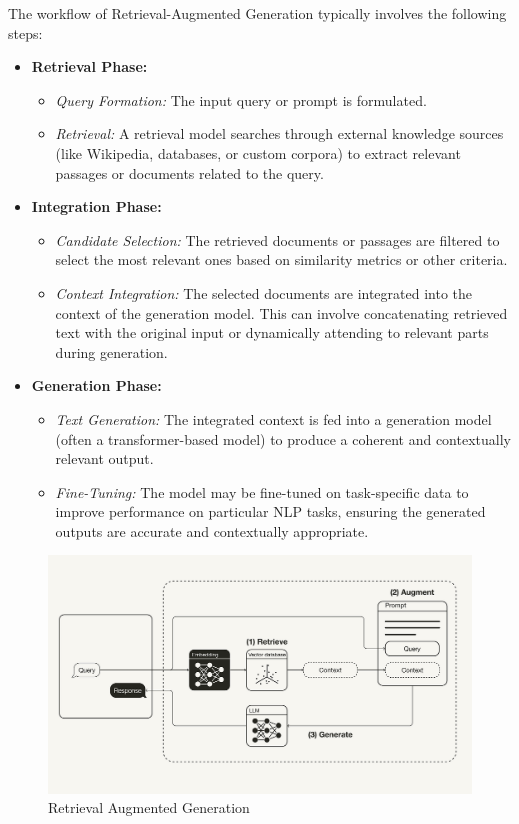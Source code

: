 The workflow of Retrieval-Augmented Generation typically involves the following steps:
\begin{itemize}
    \item \textbf{Retrieval Phase:}
    \begin{itemize}
        \item \textit{Query Formation:} The input query or prompt is formulated.
        \item \textit{Retrieval:} A retrieval model searches through external knowledge sources (like Wikipedia, databases, or custom corpora) to extract relevant passages or documents related to the query.
    \end{itemize}
    \item \textbf{Integration Phase:}
    \begin{itemize}
        \item \textit{Candidate Selection:} The retrieved documents or passages are filtered to select the most relevant ones based on similarity metrics or other criteria.
        \item \textit{Context Integration:} The selected documents are integrated into the context of the generation model. This can involve concatenating retrieved text with the original input or dynamically attending to relevant parts during generation.
    \end{itemize}
    \item \textbf{Generation Phase:}
    \begin{itemize}
        \item \textit{Text Generation:} The integrated context is fed into a generation model (often a transformer-based model) to produce a coherent and contextually relevant output.
        \item \textit{Fine-Tuning:} The model may be fine-tuned on task-specific data to improve performance on particular NLP tasks, ensuring the generated outputs are accurate and contextually appropriate.
    \end{itemize}
\end{itemize}

\begin{figure}[h!]
	\centering
	\includegraphics[scale=0.3]{figures/Rag.png}
	\caption{ Retrieval Augmented Generation }
\end{figure}

